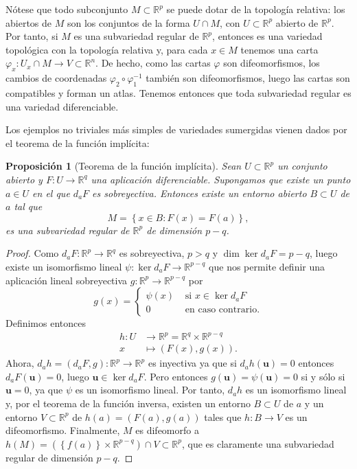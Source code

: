 \documentclass[12pt,a4paper]{book}
\newtheorem{prop}[thm]{Proposición}
\theoremstyle{definition} \newtheorem{defn}[thm]{Definición}
\theoremstyle{definition} \newtheorem{ejemplo}[thm]{Ejemplo}
\theoremstyle{definition} \newtheorem{ejercicio}[thm]{Ejercicio}
\theoremstyle{remark} \newtheorem*{obs}{Observación}
\def\RR{\mathbb{R}}
\newcommand{\ve}[1]{\mathbf{#1}}
\begin{document}
    Nótese que todo subconjunto $M\subset \RR^p$ se puede dotar de la topología relativa: los abiertos de $M$ son los conjuntos de la forma $U \cap M$, con $U \subset \RR^p$ abierto de $\RR^p$. Por tanto, si $M$ es una subvariedad regular de $\RR^p$, entonces es una variedad topológica con la topología relativa y, para cada $x\in M$ tenemos una carta $\varphi_x: U_x \cap M \rightarrow V \subset \RR^n$. De hecho, como las cartas $\varphi$ son difeomorfismos, los cambios de coordenadas $\varphi_2 \circ \varphi_1^{-1}$ también son difeomorfismos, luego las cartas son compatibles y forman un atlas. Tenemos entonces que toda subvariedad regular es una variedad diferenciable. 

    Los ejemplos no triviales más simples de variedades sumergidas vienen dados por el teorema de la función implícita: 
    \begin{prop}[Teorema de la función implícita]
    Sean $U\subset \RR^p$ un conjunto abierto y $F: U \rightarrow \RR^q$ una aplicación diferenciable. Supongamos que existe un punto $a\in U$ en el que $d_a F$ es sobreyectiva. Entonces existe un entorno abierto $B\subset U$ de $a$ tal que
    \begin{equation*}
      M=\left\{ x\in B: F(x)=F(a) \right\},
    \end{equation*}
    es una subvariedad regular de $\RR^p$ de dimensión $p-q$.
    \end{prop}
    \begin{proof}
      Como $d_a F:\RR^p \rightarrow \RR^q$ es sobreyectiva, $p>q$ y $\dim \ker d_a F =p-q$, luego existe un isomorfismo lineal $\psi:\ker d_a F \rightarrow \RR^{p-q}$ que nos permite definir una aplicación lineal sobreyectiva $g:\RR^p \rightarrow \RR^{p-q}$ por
      \begin{equation*}
	g(x)=
	\begin{cases}
	  \psi(x) & \text{ si } x \in \ker d_aF \\
	  0 & \text{ en caso contrario.}
	\end{cases}
      \end{equation*}
      Definimos entonces
      \begin{align*}
	h :U&\longrightarrow \RR^p=\RR^q \times \RR^{p-q}\\ 
	  x &\longmapsto (F(x),g(x)). 
	\end{align*}
	Ahora, $d_a h=(d_a F, g):\RR^p \rightarrow \RR^p$ es inyectiva ya que si $d_a h (\ve{u})=0$ entonces $d_a F(\ve{u})=0$, luego $\ve{u}\in \ker d_a F$. Pero entonces $g(\ve{u})=\psi(\ve{u})=0$ si y sólo si $\ve{u}=0$, ya que $\psi$ es un isomorfismo lineal. Por tanto, $d_a h$ es un isomorfismo lineal y, por el teorema de la función inversa, existen un entorno $B\subset U$ de $a$ y un entorno $V\subset \RR^p$ de $h(a)=(F(a),g(a))$ tales que $h:B\rightarrow V$ es un difeomorfismo. Finalmente, $M$ es difeomorfo a $h(M)=(\left\{ f(a) \right\}\times \RR^{p-q}) \cap V\subset \RR^p$, que es claramente una subvariedad regular de dimensión $p-q$. 
    \end{proof}
\end{document}
